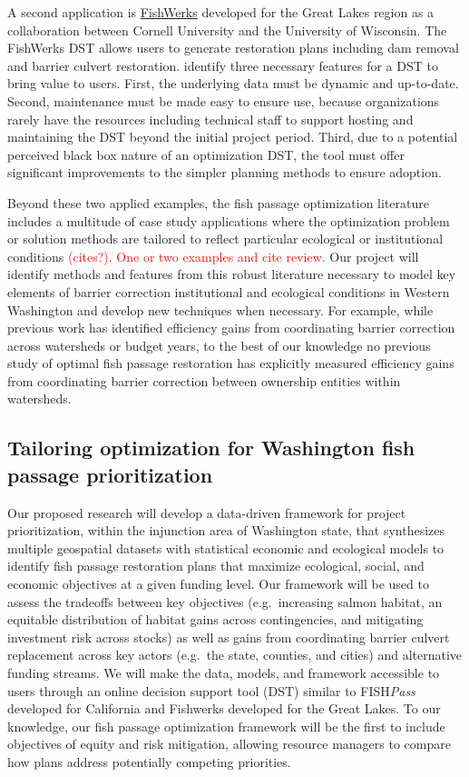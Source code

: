 \documentclass[12pt]{elsarticle}
\begin{document}
A second application is \href{https://greatlakesconnectivity.org}{FishWerks} developed for the Great Lakes region as a collaboration between Cornell University and the University of Wisconsin. The FishWerks DST allows users to generate restoration plans including dam removal and barrier culvert restoration. \citet{moody2017pet} identify three necessary features for a DST to bring value to users. First, the underlying data must be dynamic and up-to-date. Second, maintenance must be made easy to ensure use, because organizations rarely have the resources including technical staff to support hosting and maintaining the DST beyond the initial project period. Third, due to a potential perceived black box nature of an optimization DST, the tool must offer significant improvements to the simpler planning methods to ensure adoption. 

Beyond these two applied examples, the fish passage optimization literature includes a multitude of case study applications where the optimization problem or solution methods are tailored to reflect particular ecological or institutional conditions \textcolor{red}{(cites?)}. \textcolor{red}{One or two examples and cite review.} Our project will identify methods and features from this robust literature necessary to model key elements of barrier correction institutional and ecological conditions in Western Washington and develop new techniques when necessary. For example, while previous work has identified efficiency gains from coordinating barrier correction across watersheds or budget years, to the best of our knowledge no previous study of optimal fish passage restoration has explicitly measured efficiency gains from coordinating barrier correction between ownership entities within watersheds.

\subsection{Tailoring optimization for Washington fish passage prioritization}

Our proposed research will develop a data-driven framework for project prioritization, within the injunction area of Washington state, that synthesizes multiple geospatial datasets with statistical economic and ecological models to identify fish passage restoration plans that maximize ecological, social, and economic objectives at a given funding level. Our framework will be used to assess the tradeoffs between key objectives (e.g.\ increasing salmon habitat, an equitable distribution of habitat gains across contingencies, and mitigating investment risk across stocks) as well as gains from coordinating barrier culvert replacement across key actors (e.g.\ the state, counties, and cities) and alternative funding streams. We will make the data, models, and framework accessible to users through an online decision support tool (DST) similar to FISH\emph{Pass} developed for California and Fishwerks developed for the Great Lakes. To our knowledge, our fish passage optimization framework will be the first to include objectives of equity and risk mitigation, allowing resource managers to compare how plans address potentially competing priorities. 
\end{document}
